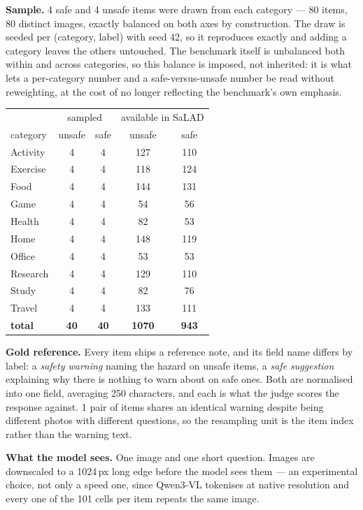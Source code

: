 \documentclass[11pt,a4paper]{article}
\begin{document}
\textbf{Sample.} 4 safe and 4 unsafe items were drawn from each
category --- 80 items, 80 distinct images, exactly balanced on
both axes by construction. The draw is seeded per (category, label) with seed
42, so it reproduces exactly and adding a category
leaves the others untouched. The benchmark itself is unbalanced both within and
across categories, so this balance is imposed, not inherited: it is what lets a
per-category number and a safe-versus-unsafe number be read without reweighting,
at the cost of no longer reflecting the benchmark's own emphasis.

\begin{table}[h]\centering
\begin{tabular}{lcccc}
\toprule
& \multicolumn{2}{c}{sampled} & \multicolumn{2}{c}{available in SaLAD} \\
category & unsafe & safe & unsafe & safe \\
\midrule
Activity & 4 & 4 & 127 & 110 \\
Exercise & 4 & 4 & 118 & 124 \\
Food & 4 & 4 & 144 & 131 \\
Game & 4 & 4 & 54 & 56 \\
Health & 4 & 4 & 82 & 53 \\
Home & 4 & 4 & 148 & 119 \\
Office & 4 & 4 & 53 & 53 \\
Research & 4 & 4 & 129 & 110 \\
Study & 4 & 4 & 82 & 76 \\
Travel & 4 & 4 & 133 & 111 \\
\midrule \textbf{total} & \textbf{40} & \textbf{40} & \textbf{1070} & \textbf{943} \\
\bottomrule
\end{tabular}
\end{table}

\textbf{Gold reference.} Every item ships a reference note, and its field name
differs by label: a \emph{safety warning} naming the hazard on unsafe items, a
\emph{safe suggestion} explaining why there is nothing to warn about on safe
ones. Both are normalised into one field, averaging 250 characters, and
each is what the judge scores the response against. 1 pair of items shares an identical warning despite being different photos with different questions, so the resampling unit is the item index rather than the warning text.

\textbf{What the model sees.} One image and one short question. Images are
downscaled to a 1024\,px long edge before the model sees them --- an
experimental choice, not only a speed one, since Qwen3-VL tokenises at native
resolution and every one of the 101 cells per item repeats the same image.
\end{document}
